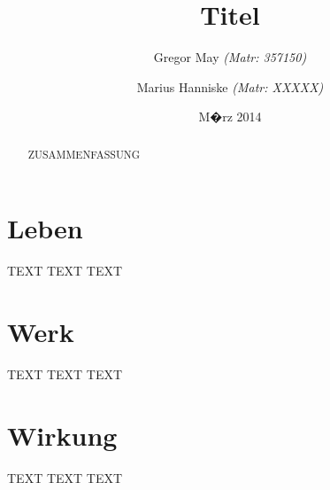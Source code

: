 \documentclass[
onecolumn,
a4paper,
abstracton,
parskip=half
,final
]{scrartcl}
\begin{document}
\titlehead{
\centering
\texttt{[image: logo\_wip.jpg]} \\
\small Technische Universit�t Berlin \\
Fakult�t VII (Wirtschaft \& Management) \\
Fachgebiet Wirtschafts- und Infrastrukturpolitik (WIP)
}
\title{Titel}
\author{
Gregor May
\footnotesize \textit{(Matr: 357150)}
\and
Marius Hanniske
\footnotesize \textit{(Matr: XXXXX)}
\and

}
\date{M�rz 2014}

\maketitle


\begin{abstract}
ZUSAMMENFASSUNG
\end{abstract}

\begin{flushleft}
\end{flushleft}

\tableofcontents
\listoffigures
\listoftables

\newpage
\onehalfspacing



\section{Leben}
\label{sec1:leben}
TEXT TEXT TEXT

\clearpage
\section{Werk}
\label{sec1:werk}
TEXT TEXT TEXT

\clearpage
\section{Wirkung}
\label{sec1:wirkung}
TEXT TEXT TEXT




\vspace{10pt}
\singlespacing

\newpage


%
\end{document}
